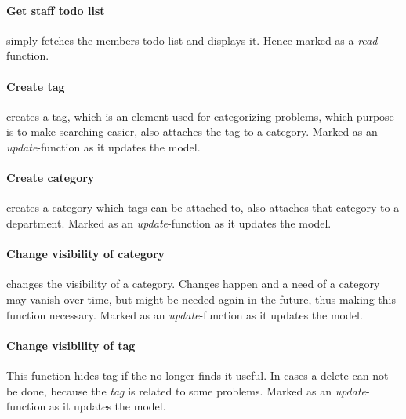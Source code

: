 \paragraph{Get staff todo list} simply fetches the \astaff[] members todo list and displays it. Hence marked as a \textit{read}-function. 

\paragraph{Create tag} creates a tag, which is an element used for categorizing problems, which purpose is to make searching easier, also attaches the tag to a category. Marked as an \textit{update}-function as it updates the model. 

\paragraph{Create category} creates a category which tags can be attached to, also attaches that category to a department. Marked as an \textit{update}-function as it updates the model. 

\paragraph{Change visibility of category} changes the visibility of a category. Changes happen and a need of a category may vanish over time, but might be needed again in the future, thus making this function necessary. Marked as an \textit{update}-function as it updates the model. 

\paragraph{Change visibility of tag} This function hides tag if the \sadmin{} no longer finds it useful. In cases a delete can not be done, because the \textit{tag} is related to some problems. Marked as an \textit{update}-function as it updates the model. 



